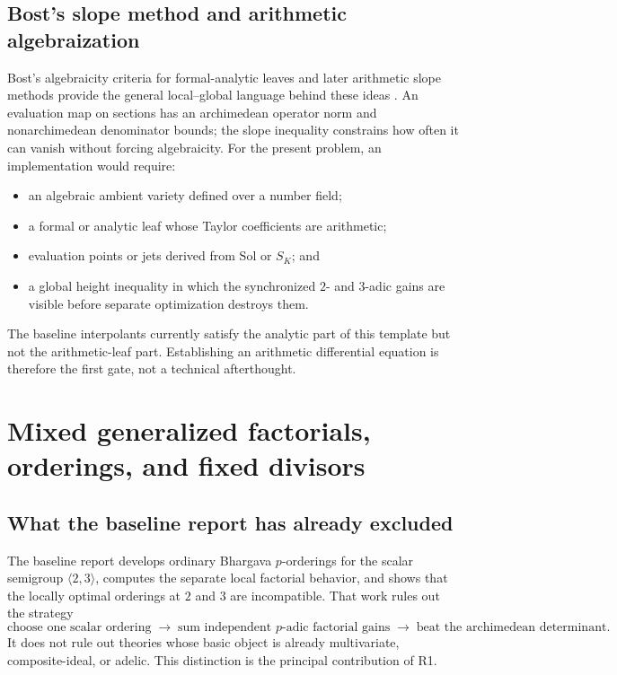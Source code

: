 \documentclass[10pt,letterpaper]{article}
\newcommand{\Sol}{\mathrm{Sol}}
\newcommand{\Rone}{\textsf{R1}}
\begin{document}
\subsection{Bost's slope method and arithmetic algebraization}

Bost's algebraicity criteria for formal-analytic leaves and later arithmetic slope methods
provide the general local--global language behind these ideas \cite{Bost2001,BostCharles}.
An evaluation map on sections has an archimedean operator norm and nonarchimedean denominator
bounds; the slope inequality constrains how often it can vanish without forcing algebraicity.
For the present problem, an implementation would require:

\begin{itemize}
\item an algebraic ambient variety defined over a number field;
\item a formal or analytic leaf whose Taylor coefficients are arithmetic;
\item evaluation points or jets derived from \(\Sol\) or \(S_K\); and
\item a global height inequality in which the synchronized \(2\)- and \(3\)-adic gains are
visible before separate optimization destroys them.
\end{itemize}

The baseline interpolants currently satisfy the analytic part of this template but not the
arithmetic-leaf part.  Establishing an arithmetic differential equation is therefore the
first gate, not a technical afterthought.

\clearpage
\section{Mixed generalized factorials, orderings, and fixed divisors}
\label{sec:factorials}

\subsection{What the baseline report has already excluded}

The baseline report develops ordinary Bhargava \(p\)-orderings for the scalar semigroup
\(\langle2,3\rangle\), computes the separate local factorial behavior, and shows that the
locally optimal orderings at \(2\) and \(3\) are incompatible.  That work rules out the
strategy
\[
  \text{choose one scalar ordering}\;\longrightarrow\;
  \text{sum independent \(p\)-adic factorial gains}\;\longrightarrow\;
  \text{beat the archimedean determinant}.
\]
It does not rule out theories whose basic object is already multivariate, composite-ideal, or
adelic.  This distinction is the principal contribution of \Rone.
\end{document}
